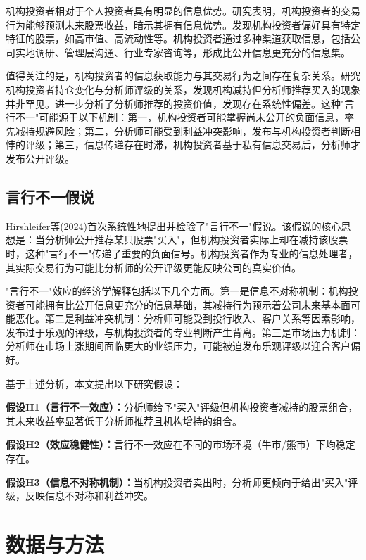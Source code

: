 \documentclass[12pt,a4paper]{article}
\begin{document}
机构投资者相对于个人投资者具有明显的信息优势。\cite{wermers1999mutual}研究表明，机构投资者的交易行为能够预测未来股票收益，暗示其拥有信息优势。\cite{falkenstein1996preferences}发现机构投资者偏好具有特定特征的股票，如高市值、高流动性等。机构投资者通过多种渠道获取信息，包括公司实地调研、管理层沟通、行业专家咨询等，形成比公开信息更充分的信息集。

值得关注的是，机构投资者的信息获取能力与其交易行为之间存在复杂关系。\cite{michaely2004conflicts}研究机构投资者持仓变化与分析师评级的关系，发现机构减持但分析师推荐买入的现象并非罕见。\cite{barber2001analyst}进一步分析了分析师推荐的投资价值，发现存在系统性偏差。这种"言行不一"可能源于以下机制：第一，机构投资者可能掌握尚未公开的负面信息，率先减持规避风险；第二，分析师可能受到利益冲突影响，发布与机构投资者判断相悖的评级；第三，信息传递存在时滞，机构投资者基于私有信息交易后，分析师才发布公开评级。

\subsection{言行不一假说}

Hirshleifer等(2024)首次系统性地提出并检验了"言行不一"假说。该假说的核心思想是：当分析师公开推荐某只股票"买入"，但机构投资者实际上却在减持该股票时，这种"言行不一"传递了重要的负面信号。机构投资者作为专业的信息处理者，其实际交易行为可能比分析师的公开评级更能反映公司的真实价值。

"言行不一"效应的经济学解释包括以下几个方面。第一是信息不对称机制：机构投资者可能拥有比公开信息更充分的信息基础，其减持行为预示着公司未来基本面可能恶化。第二是利益冲突机制：分析师可能受到投行收入、客户关系等因素影响，发布过于乐观的评级，与机构投资者的专业判断产生背离。第三是市场压力机制：分析师在市场上涨期间面临更大的业绩压力，可能被迫发布乐观评级以迎合客户偏好。

基于上述分析，本文提出以下研究假设：

\textbf{假设H1（言行不一效应）：}分析师给予"买入"评级但机构投资者减持的股票组合，其未来收益率显著低于分析师推荐且机构增持的组合。

\textbf{假设H2（效应稳健性）：}言行不一效应在不同的市场环境（牛市/熊市）下均稳定存在。

\textbf{假设H3（信息不对称机制）：}当机构投资者卖出时，分析师更倾向于给出"买入"评级，反映信息不对称和利益冲突。

\section{数据与方法}
\end{document}
